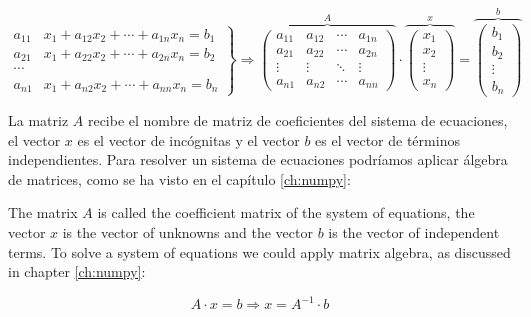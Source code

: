 \begin{equation*}
\left. \begin{aligned}
a_{11}&x_1+a_{12}x_2+\cdots +a_{1n}x_n=b_1\\
a_{21}&x_1+a_{22}x_2+\cdots +a_{2n}x_n=b_2\\
\cdots & \\
a_{n1}&x_1+a_{n2}x_2+\cdots +a_{nn}x_n=b_n
\end{aligned}\right\} \Rightarrow	\overbrace{\begin{pmatrix}
a_{11}& a_{12}& \cdots & a_{1n}\\
a_{21}& a_{22}& \cdots & a_{2n}\\
\vdots & \vdots & \ddots & \vdots\\
a_{n1}& a_{n2}& \cdots & a_{nn}
\end{pmatrix}}^A \cdot \overbrace{\begin{pmatrix}
x_1\\
x_2\\
\vdots \\
x_n
\end{pmatrix}}^x=\overbrace{\begin{pmatrix}
b_1\\
b_2\\
\vdots \\
b_n
\end{pmatrix}}^b
\end{equation*}

\begin{paracol}{2}
    La matriz $A$ recibe el nombre de matriz de coeficientes del sistema de ecuaciones, el vector $x$ es el vector de incógnitas y el vector $b$ es el vector de términos independientes. Para resolver un sistema de ecuaciones podríamos aplicar álgebra de matrices, como se ha visto en el capítulo \ref{ch:numpy}:
    
\switchcolumn
    The matrix $A$ is called the coefficient matrix of the system of equations, the vector $x$ is the vector of unknowns and the vector $b$ is the vector of independent terms. To solve a system of equations we could apply matrix algebra, as discussed in chapter \ref{ch:numpy}:
    
\end{paracol}

\begin{equation*}
A\cdot x=b \Rightarrow x=A^{-1}\cdot b
\end{equation*}

